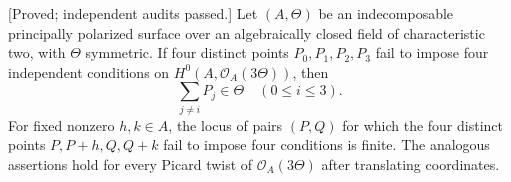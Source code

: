 \begin{lemma}
\label{lem:nonproduct-three-theta-four-values-candidate}
\textup{[Proved; independent audits passed.]}
Let $(A,\Theta)$ be an indecomposable principally polarized surface
over an algebraically closed field of characteristic two, with
$\Theta$ symmetric. If four distinct points $P_0,P_1,P_2,P_3$
fail to impose four independent conditions on
$H^0(A,\mathcal O_A(3\Theta))$, then
\[
                    \sum_{j\ne i}P_j\in\Theta
                           \quad(0\le i\le3).
\]
For fixed nonzero $h,k\in A$, the locus of pairs $(P,Q)$ for which
the four distinct points $P,P+h,Q,Q+k$ fail to impose four
conditions is finite. The analogous assertions hold for every
Picard twist of $\mathcal O_A(3\Theta)$ after translating coordinates.
\end{lemma}
